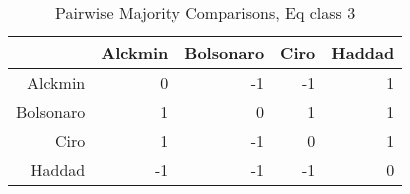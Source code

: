 \begin{table}[ht]
\centering
\begin{tabular}{rrrrr}
  \hline
 & Alckmin & Bolsonaro & Ciro & Haddad \\ 
  \hline
Alckmin & 0 & -1 & -1 & 1 \\ 
  Bolsonaro & 1 & 0 & 1 & 1 \\ 
  Ciro & 1 & -1 & 0 & 1 \\ 
  Haddad & -1 & -1 & -1 & 0 \\ 
   \hline
\end{tabular}
\caption{Pairwise Majority Comparisons, Eq class 3} 
\label{tbl:subtab3}
\end{table}
